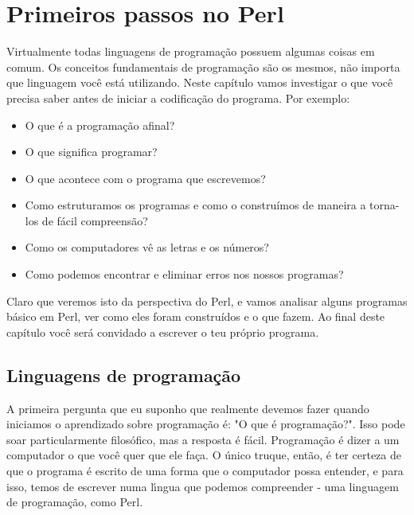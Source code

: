 \documentclass[a4paper,12pt,twoside]{book}
\newenvironment{intro}{\sffamily}{\vspace*{2ex minus 1.5ex}}
\begin{document}
  \chapter{Primeiros passos no Perl}

  \begin{intro}
    \noindent Virtualmente todas linguagens de programa\c{c}\~ao possuem algumas 
    coisas em comum. Os conceitos fundamentais de programa\c{c}\~ao s\~ao os mesmos, 
    n\~ao importa que linguagem voc\^e est\'a utilizando. Neste cap\'itulo vamos 
    investigar o que voc\^e precisa saber antes de iniciar a codifica\c{c}\~ao do programa. 
    Por exemplo:
 
    \begin{itemize}

      \item O que \'e a programa\c{c}\~ao afinal? 

      \item O que significa programar?

      \item O que acontece com o programa que escrevemos?

      \item Como estruturamos os programas e como o constru\'imos de maneira a torna-los de f\'acil compreens\~ao?

      \item Como os computadores v\^e as letras e os n\'umeros?

      \item Como podemos encontrar e eliminar erros nos nossos programas? 

    \end{itemize}

    \noindent Claro que veremos isto da perspectiva do Perl, e vamos analisar alguns
    programas b\'asico em Perl, ver como eles foram constru\'idos e o que fazem. Ao 
    final deste cap\'itulo voc\^e ser\'a convidado a escrever o teu pr\'oprio programa.
  \end{intro}

\section{Linguagens de programa\c{c}\~ao}

  \noindent A primeira pergunta que eu suponho que realmente devemos fazer quando 
  iniciamos o aprendizado sobre programa\c{c}\~ao \'e: "O que \'e programa\c{c}\~ao?".
  Isso pode soar particularmente filos\'ofico, mas a resposta \'e f\'acil. 
  Programa\c{c}\~ao \'e dizer a um computador o que voc\^e quer que ele fa\c{c}a. 
  O \'unico truque, ent\~ao, \'e ter certeza de que o programa \'e escrito de uma forma 
  que o computador possa entender, e para isso, temos de escrever numa l\'{\i}ngua que 
  podemos compreender - uma linguagem de programa\c{c}\~ao, como Perl.\medskip
\end{document}
